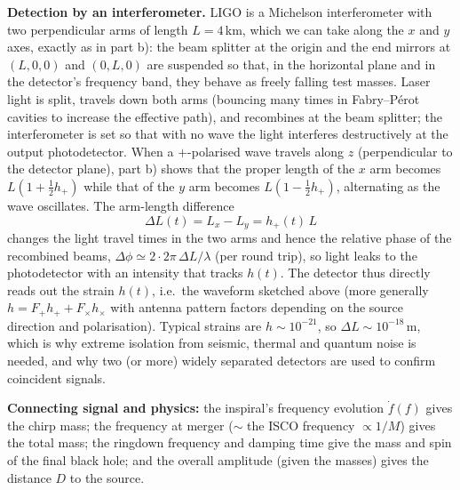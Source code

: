 \documentclass[12pt]{article}
\newcommand{\be}{\begin{equation}}
\newcommand{\ee}{\end{equation}}
\begin{document}
\begin{enumerate}[label=\alph*)]
\textbf{Detection by an interferometer.} LIGO is a Michelson interferometer with two perpendicular arms of length
$L = 4$\,km, which we can take along the $x$ and $y$ axes, exactly as in part b): the beam splitter at the origin and the end
mirrors at $(L,0,0)$ and $(0,L,0)$ are suspended so that, in the horizontal plane and in the detector's frequency
band, they behave as freely falling test masses. Laser light is split, travels down both arms (bouncing many times in
Fabry--P\'erot cavities to increase the effective path), and recombines at the beam splitter; the interferometer is set
so that with no wave the light interferes destructively at the output photodetector. When a $+$-polarised wave travels
along $z$ (perpendicular to the detector plane), part b) shows that the proper length of the $x$ arm becomes
$L(1+\frac12 h_+)$ while that of the $y$ arm becomes $L(1-\frac12h_+)$, alternating as the wave oscillates. The arm-length
difference
\be
\Delta L(t) = L_x - L_y = h_+(t)\,L
\ee
changes the light travel times in the two arms and hence the relative phase of the recombined beams,
$\Delta\phi\simeq 2\cdot 2\pi\,\Delta L/\lambda$ (per round trip), so light leaks to the photodetector with an intensity
that tracks $h(t)$. The detector thus directly reads out the strain $h(t)$, i.e.\ the waveform sketched above (more generally
$h = F_+h_+ + F_\times h_\times$ with antenna pattern factors depending on the source direction and polarisation). Typical strains are
$h\sim10^{-21}$, so $\Delta L\sim 10^{-18}$\,m, which is why extreme isolation from seismic, thermal and quantum noise is
needed, and why two (or more) widely separated detectors are used to confirm coincident signals.

\textbf{Connecting signal and physics:} the inspiral's frequency evolution $\dot f(f)$ gives the chirp mass; the frequency
at merger ($\sim$ the ISCO frequency $\propto 1/M$) gives the total mass; the ringdown frequency and damping time give the
mass and spin of the final black hole; and the overall amplitude (given the masses) gives the distance $D$ to the source.
\end{enumerate}
\end{document}
